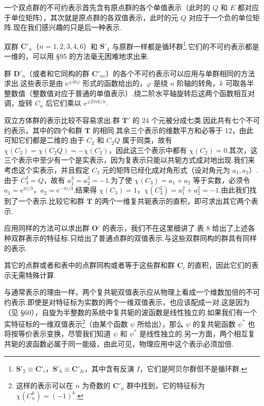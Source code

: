 一个双点群的不可约表示首先含有原点群的各个单值表示（此时的 $Q$ 和 $E$ 都对应于单位矩阵），其次就是原点群的各双值表示，此时的元 $Q$ 对应于一个负的单位矩阵.现在我们感兴趣的只是后一种表示.

双群 $\boldsymbol{C}'_n$（$n=1,2,3,4,6$）和 $\boldsymbol{S}'_4$ 与原群一样都是循环群\footnote{$\boldsymbol{S}'_2\equiv\boldsymbol{C}'_i$，$\boldsymbol{S}'_6\equiv\boldsymbol{C}'_{3i}$，其中含有反演 $I$，它们是阿贝尔群但不是循环群.}.它们的不可约表示都是一维的，可以用 §95 的方法毫无困难地求出来.

群 $\boldsymbol{D}'_n$（或者和它同构的群 $\boldsymbol{C}'_{nv}$）的各个不可约表示可以应用与单群相同的方法求出.这些表示是由 $\mathrm{e}^{\pm ik\varphi}$ 形式的函数给出的，$\varphi$ 是绕 $n$ 阶轴的转角，$k$ 可取各半整数值（整数值对应于普通的单值表示）.绕二阶水平轴旋转后这两个函数相互对调，旋转 $C_n$ 后它们乘以 $\mathrm{e}^{\pm2\pi ik/n}$.

双立方体群的表示比较不容易求出.群 $\boldsymbol{T}'$ 的 24 个元被分成七类.因此共有七个不可约表示，其中的四个和群 $\boldsymbol{T}$ 的相同.其余三个表示的维数平方和必等于 12，由此可知它们都是二维的.由于 $C_2$ 和 $C_2Q$ 属于同类，故有 $\chi(C_2)=\chi(C_2Q)=-\chi(C_2)$，因此这三个表示中都有 $\chi(C_2)=0$.其次，这三个表示中至少有一个是实表示，因为复表示只能以共轭方式成对地出现.我们来考虑这个实表示，并且假定 $C_3$ 元的矩阵已经化成对角形式（设对角元为 $a_1,a_2$）.由于 $C_3^3=Q$，故有 $a_1^3=a_2^3=-1$.为了使 $\chi(C_3)=a_1+a_2$ 等于实数，必须令 $a_1=\mathrm{e}^{\pi i/3}$，$a_2=\mathrm{e}^{-\pi i/3}$.结果得 $\chi(C_3)=1$，$\chi(C_3^2)=a_1^2+a_2^2=-1$.由此我们找到了一个表示.比较它和群 $\boldsymbol{T}$ 的两个一维复共轭表示的直积，即可求出其它两个表示.

应用同样的方法可以求出群 $\boldsymbol{O}'$ 的表示，我们不在这里细讲了.表 8 给出了上述各种双群表示的特征标.只给出了普通点群的双值表示.与这些双群同构的群具有同样的表示.

其它的点群或者和表中的点群同构或者等于这些群和群 $\boldsymbol{C}_i$ 的直积，因此它们的表示无需特殊计算.

与通常表示的理由一样，两个复共轭双值表示应从物理上看成一个维数加倍的不可约表示.即使是对特征标为实数的两个一维双值表示，也应该配成一对.这是因为（见 §60），自旋为半整数的系统中复共轭的波函数是线性独立的.如果我们有一个实特征标的一维双值表示\footnote{这样的表示可以在 $n$ 为奇数的 $\boldsymbol{C}'_n$ 群中找到，它的特征标为 $\chi(C_n^k)=(-1)^k$.}（由某个函数 $\psi$ 所给出），那么 $\psi$ 的复共轭函数 $\psi^{*}$ 也将按等价表示变换，尽管我们知道 $\psi$ 和 $\psi^{*}$ 是线性独立的.另一方面，两个相互复共轭的波函数必属于同一能级，由此可见，物理应用中这个表示必须加倍.

